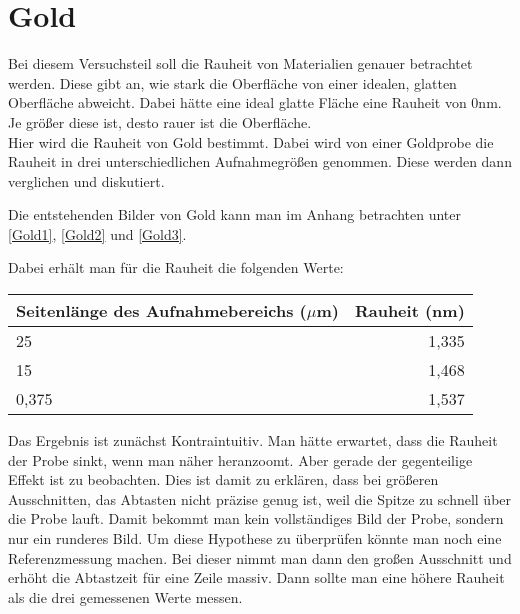 \section{Gold}

Bei diesem Versuchsteil soll die Rauheit von Materialien genauer betrachtet werden. Diese gibt an, wie stark die Oberfläche von einer idealen, glatten Oberfläche abweicht. 
Dabei hätte eine ideal glatte Fläche eine Rauheit von 0nm. Je größer diese ist, desto rauer ist die Oberfläche.\\

Hier wird die Rauheit von Gold bestimmt. Dabei wird von einer Goldprobe die Rauheit in drei unterschiedlichen 
Aufnahmegrößen genommen. Diese werden dann verglichen und diskutiert.

Die entstehenden Bilder von Gold kann man im Anhang betrachten unter \ref{Gold1}, \ref{Gold2} und \ref{Gold3}.

Dabei erhält man für die Rauheit die folgenden Werte:\\
\begin{center}
    \centering
    \begin{tabular}{lr}
        \toprule
        Seitenlänge des Aufnahmebereichs ($\mu$m) & Rauheit (nm)\\
        \midrule
        25 & 1,335\\
        15 & 1,468 \\
        0,375 & 1,537\\
    \end{tabular}
\end{center}

Das Ergebnis ist zunächst Kontraintuitiv. Man hätte erwartet, dass die Rauheit der Probe sinkt, 
wenn man näher heranzoomt. Aber gerade der gegenteilige Effekt ist zu beobachten. Dies ist damit zu erklären, 
dass bei größeren Ausschnitten, das Abtasten nicht präzise genug ist, weil 
die Spitze zu schnell über die Probe lauft. Damit bekommt man kein vollständiges Bild der Probe, sondern nur ein runderes Bild. 
Um diese Hypothese zu überprüfen könnte man noch eine Referenzmessung machen. Bei dieser nimmt man dann den großen Ausschnitt und 
erhöht die Abtastzeit für eine Zeile massiv. Dann sollte man eine höhere Rauheit als die 
drei gemessenen Werte messen.